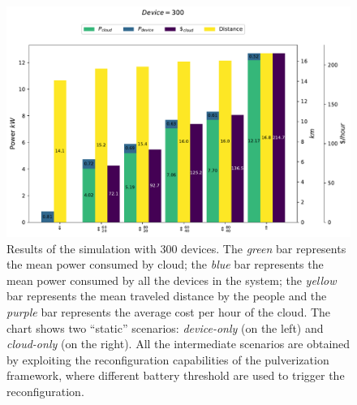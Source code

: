 \documentclass[conference]{IEEEtran}
\begin{document}
\begin{figure}[ht]
    \begin{minipage}{\columnwidth}
        \includegraphics[width=\linewidth]{figures/cloud_cost-device_consumption-cloud_consumption-distance-device=300.0.pdf}
    \end{minipage}
    \caption{
        Results of the simulation with 300 devices.
        The \emph{green} bar represents the mean power consumed by cloud;
        the \emph{blue} bar represents the mean power consumed by all the devices in the system;
        the \emph{yellow} bar represents the mean traveled distance by the people
        and the \emph{purple} bar represents the average cost per hour of the cloud.
        The chart shows two ``static'' scenarios: \emph{device-only} (on the left) and \emph{cloud-only} (on the right).
        All the intermediate scenarios are obtained by exploiting the reconfiguration capabilities of the pulverization framework,
        where different battery threshold are used to trigger the reconfiguration.
    }
    \label{fig:result-300-devices}
\end{figure}
\end{document}
